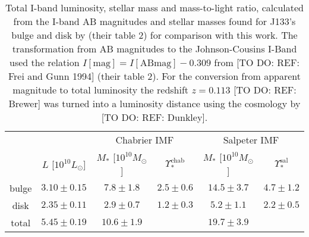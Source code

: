 \begin{table}
\centering
\begin{tabular}{cccccc}
\hline\hline
& & \multicolumn{2}{c}{Chabrier IMF} & \multicolumn{2}{c}{Salpeter IMF}\\
      &  $L$ [$10^{10}L_{\odot}$]                & $M_*$ [$10^{10}M_\odot$]               & $\Upsilon_*^\text{chab}$ & $M_*$ [$10^{10}M_\odot$] & $\Upsilon_*^\text{sal}$ \\\hline
bulge &   $3.10 \pm 0.15 $  & $7.8 \pm 1.8$ & $2.5 \pm 0.6$ & $14.5 \pm 3.7 $ & $4.7 \pm 1.2$ \\
disk  &   $2.35 \pm 0.11 $  & $2.9 \pm 0.7$ & $1.2 \pm 0.3$ & $5.2 \pm 1.1$ & $2.2 \pm 0.5$ \\
total &   $5.45 \pm 0.19$ & $10.6 \pm 1.9$& & $19.7 \pm 3.9$&\\\hline
\end{tabular}
\caption{Total I-band luminosity, stellar mass and mass-to-light ratio, calculated from the I-band AB magnitudes and stellar masses found for J133's bulge and disk by \citet{SWELLS} (their table 2) for comparison with this work. The transformation from AB magnitudes to the Johnson-Cousins I-Band used the relation $I[\text{mag}] = I[\text{ABmag}] - 0.309$ from [TO DO: REF: Frei and Gunn 1994] (their table 2). For the conversion from apparent magnitude to total luminosity the redshift $z=0.113$ [TO DO: REF: Brewer] was turned into a luminosity distance using the cosmology by [TO DO: REF: Dunkley]. }
\label{tab:previousresults}
\end{table}